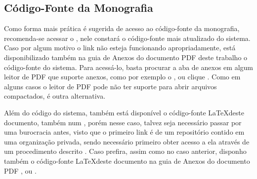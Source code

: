 \newcommand{\MyCheckbox}[2] {
  \item \CheckBox[name=#2, checkboxsymbol=\ding{53}]{ } #1
}

\newcommand{\FormInNewLine}[1]{
  \begin{description}
    \item[] #1
  \end{description}
}

\newcommand{\QuestionNameOptions}[3]{
  \item #1
  \FormInNewLine{\ChoiceMenu[print, combo, name=#2]{ }{#3}}
}

\begin{apendicesenv} %

  \chapter{Código-Fonte da Monografia} \label{apendice:CodigoFonte}

  Como forma mais prática é sugerida de acesso ao código-fonte da monografia, recomenda-se acessar o , nele constará o código-fonte mais atualizado do sistema. Caso por algum motivo o link não esteja funcionando apropriadamente, está disponibilizado também na guia de Anexos do documento PDF deste trabalho o código-fonte do sistema. Para acessá-lo, basta procurar a aba de anexos em algum leitor de PDF que suporte anexos, como por exemplo o , ou clique . Como em alguns casos o leitor de PDF pode não ter suporte para abrir arquivos compactados,  é outra alternativa.

  Além do código do sistema, também está disponível o código-fonte \LaTeX deste documento, também num , porém nesse caso, talvez seja necessário passar por uma burocracia antes, visto que o primeiro link é de um repositório contido em uma organização privada, sendo necessário primeiro obter acesso a ela através de um procedimento descrito . Caso prefira, assim como no caso anterior, disponho também o código-fonte \LaTeX deste documento na guia de Anexos do documento PDF , ou .


\end{apendicesenv}
